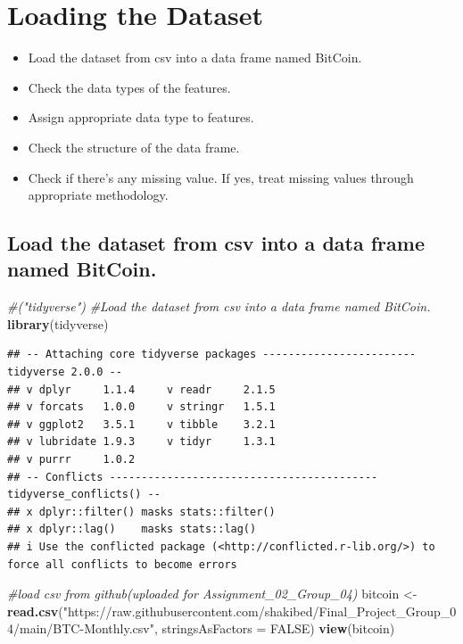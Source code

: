 \documentclass[
]{book}
\newenvironment{Shaded}{\begin{snugshade}}{\end{snugshade}}
\newcommand{\AttributeTok}[1]{\textcolor[rgb]{0.13,0.29,0.53}{#1}}
\newcommand{\CommentTok}[1]{\textcolor[rgb]{0.56,0.35,0.01}{\textit{#1}}}
\newcommand{\ConstantTok}[1]{\textcolor[rgb]{0.56,0.35,0.01}{#1}}
\newcommand{\FunctionTok}[1]{\textcolor[rgb]{0.13,0.29,0.53}{\textbf{#1}}}
\newcommand{\NormalTok}[1]{#1}
\newcommand{\OtherTok}[1]{\textcolor[rgb]{0.56,0.35,0.01}{#1}}
\newcommand{\StringTok}[1]{\textcolor[rgb]{0.31,0.60,0.02}{#1}}
\providecommand{\tightlist}{%
  \setlength{\itemsep}{0pt}\setlength{\parskip}{0pt}}
\begin{document}
\section*{Loading the Dataset}\label{loading-the-dataset}

\begin{itemize}
\tightlist
\item
  Load the dataset from csv into a data frame named BitCoin.
\item
  Check the data types of the features.
\item
  Assign appropriate data type to features.
\item
  Check the structure of the data frame.
\item
  Check if there's any missing value. If yes, treat missing values through appropriate methodology.
\end{itemize}

\subsection*{Load the dataset from csv into a data frame named BitCoin.}\label{load-the-dataset-from-csv-into-a-data-frame-named-bitcoin.}

\begin{Shaded}
\begin{Highlighting}[]
\CommentTok{\#("tidyverse")}
\CommentTok{\#Load the dataset from csv into a data frame named BitCoin.}
\FunctionTok{library}\NormalTok{(tidyverse)}
\end{Highlighting}
\end{Shaded}

\begin{verbatim}
## -- Attaching core tidyverse packages ------------------------ tidyverse 2.0.0 --
## v dplyr     1.1.4     v readr     2.1.5
## v forcats   1.0.0     v stringr   1.5.1
## v ggplot2   3.5.1     v tibble    3.2.1
## v lubridate 1.9.3     v tidyr     1.3.1
## v purrr     1.0.2     
## -- Conflicts ------------------------------------------ tidyverse_conflicts() --
## x dplyr::filter() masks stats::filter()
## x dplyr::lag()    masks stats::lag()
## i Use the conflicted package (<http://conflicted.r-lib.org/>) to force all conflicts to become errors
\end{verbatim}

\begin{Shaded}
\begin{Highlighting}[]
\CommentTok{\#load csv from github(uploaded for Assignment\_02\_Group\_04)}
\NormalTok{bitcoin }\OtherTok{\textless{}{-}} \FunctionTok{read.csv}\NormalTok{(}\StringTok{"https://raw.githubusercontent.com/shakibed/Final\_Project\_Group\_04/main/BTC{-}Monthly.csv"}\NormalTok{, }\AttributeTok{stringsAsFactors =} \ConstantTok{FALSE}\NormalTok{)}
\FunctionTok{view}\NormalTok{(bitcoin)}
\end{Highlighting}
\end{Shaded}
\end{document}
